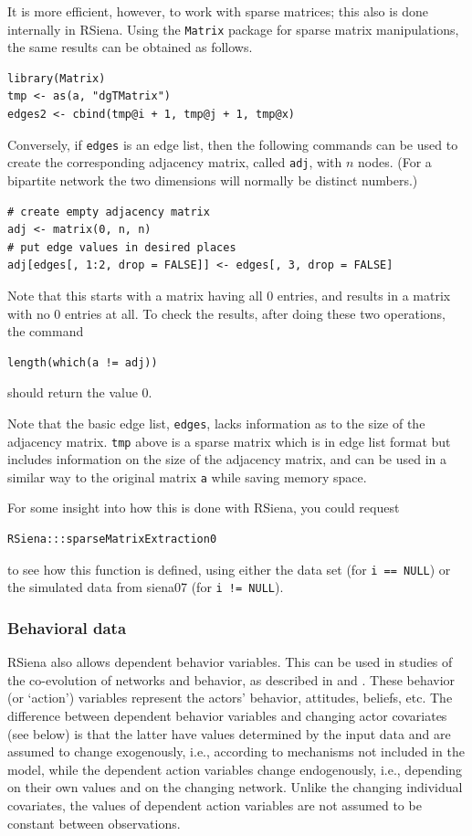 \documentclass[a4paper,fleqn,11pt]{article}
\newcommand{\+}{\, + \,}
\newcommand{\sfn}[1]{\textsf{#1}}
\newcommand{\rs}{{\sf RSiena}}
\newcommand{\RS}{{\sf \textsf{RSiena} }}
\begin{document}
It is more efficient, however, to work with sparse matrices;
this also is done internally in \rs.
Using the \texttt{Matrix} package for sparse matrix manipulations,
the same results can be obtained as follows.
\begin{verbatim}
library(Matrix)
tmp <- as(a, "dgTMatrix")
edges2 <- cbind(tmp@i + 1, tmp@j + 1, tmp@x)
\end{verbatim}
Conversely, if \texttt{edges} is an edge list, then the following commands
can be used to create the corresponding
adjacency matrix, called \texttt{adj},
with $n$ nodes. (For a bipartite network the two dimensions
will normally be distinct numbers.)
\begin{verbatim}
# create empty adjacency matrix
adj <- matrix(0, n, n)
# put edge values in desired places
adj[edges[, 1:2, drop = FALSE]] <- edges[, 3, drop = FALSE]
\end{verbatim}
Note that this starts with a matrix having all 0 entries,
and results in a matrix with no 0 entries at all.
To check the results, after doing these two operations, the command
\begin{verbatim}
length(which(a != adj))
\end{verbatim}
should return the value 0.

Note that the basic edge list, \verb|edges|, lacks information as to the size of
the adjacency matrix. \verb|tmp| above is a sparse matrix which is in edge list
format but includes information on the size of the adjacency matrix, and can be
used in a similar way to the original matrix \verb|a| while saving memory space.

For some insight into how this is done with \rs, you could request
\begin{verbatim}
RSiena:::sparseMatrixExtraction0
\end{verbatim}
to see how this function is defined, using either the data set (for \texttt{i == NULL})
or the simulated data from \sfn{siena07} (for \texttt{i != NULL}).


\subsubsection{Behavioral data}

\RS also allows dependent behavior variables. This can be used in studies
of the co-evolution of networks and behavior, as described
in \citet*{SnijdersEA07} and \citet*{SteglichEA10}.
These behavior (or `action') variables represent
the actors' behavior, attitudes, beliefs, etc.
The difference between dependent behavior variables and changing actor
covariates (see below) is that the latter
have values determined by the input data and are assumed to
change exogenously, i.e., according
to mechanisms not included in the model, while the dependent
action variables change endogenously, i.e.,
depending on their own values and on the changing network.
Unlike the changing individual covariates,
the values of dependent action variables are not assumed to be
constant between observations.
\end{document}

